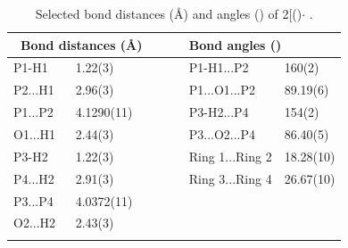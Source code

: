\begin{table}[htp]
\small
\caption[Selected bond distances (\AA) and angles (\degrees) of 2[(\tButhixantphos)\ce{H]\\CPh(SO2CF3)2}$\cdot{}$ ]{Selected bond distances (\AA) and angles (\degrees) of 2[(\tButhixantphos)\-\ce{H]CPh(SO2CF3)2}$\cdot{}$ .}
\vspace{1em}
\label{table:crystalprotonated:lengths}
\begin{center}
\begin{tabular}{l l l l l}
	\toprule
	\multicolumn{2}{l}{\bfseries{~Bond distances (\si{\angstrom})}} &~~~& \multicolumn{2}{l}{\bfseries{Bond angles (\degrees)}} \\
	\midrule		
	P1-H1	& 1.22(3)		&~~~& P1-H1...P2	& 160(2)\\
	P2...H1	& 2.96(3)		&~~~& P1...O1...P2	& 89.19(6)\\
	P1...P2	& 4.1290(11)	&~~~& P3-H2...P4	& 154(2)\\
	O1...H1	& 2.44(3)		&~~~& P3...O2...P4	& 86.40(5)\\
	P3-H2	& 1.22(3)		&~~~& Ring 1...Ring 2 & 18.28(10)\\
	P4...H2	& 2.91(3)		&~~~& Ring 3...Ring 4 & 26.67(10)\\
	P3...P4	& 4.0372(11)	&~~~& ~			& ~\\
	O2...H2	& 2.43(3)		&~~~& ~			& ~\\
	\bottomrule{}
\end{tabular}
\end{center}
\end{table}


